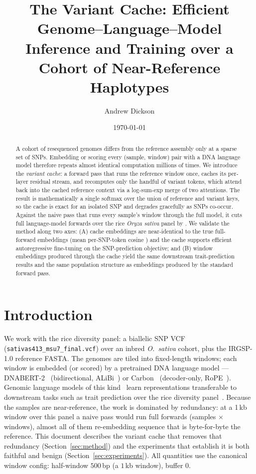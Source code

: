 \documentclass[11pt]{article}
\title{The Variant Cache: Efficient Genome--Language--Model Inference and
Training over a Cohort of Near-Reference Haplotypes}
\author{Andrew Dickson}
\date{\today}
\begin{document}
\maketitle

\begin{abstract}
A cohort of resequenced genomes differs from the reference assembly only at a
sparse set of SNPs. Embedding or scoring every (sample, window) pair with a DNA
language model therefore repeats almost identical computation millions of times.
We introduce the \emph{variant cache}: a forward pass that runs the reference
window once, caches its per-layer residual stream, and recomputes only the
handful of variant tokens, which attend back into the cached reference context
via a log-sum-exp merge of two attentions. The result is mathematically a single
softmax over the union of reference and variant keys, so the cache is exact for
an isolated SNP and degrades gracefully as SNPs co-occur. Against the naive pass
that runs every sample's window through the full model, it cuts full
language-model forwards over the rice \textit{Oryza sativa} panel by
\cacheFactor{}. We validate the method along two
axes: (A) cache embeddings are near-identical to the true full-forward
embeddings (mean per-SNP-token cosine \varCosMean{}) and the cache supports
efficient autoregressive fine-tuning on the SNP-prediction objective; and (B)
window embeddings produced through the cache yield the same downstream
trait-prediction results and the same population structure as
embeddings produced by the standard forward pass.
\end{abstract}

\section{Introduction}
\label{sec:intro}
We work with the rice diversity panel: a biallelic SNP VCF
(\texttt{sativas413\_msu7\_final.vcf}) over an inbred \textit{O.\ sativa} cohort,
plus the IRGSP-1.0 reference FASTA. The genomes are tiled into fixed-length
windows; each window is embedded (or scored) by a pretrained DNA language model
--- DNABERT-2~\cite{zhou2023dnabert2} (bidirectional, ALiBi~\cite{press2022alibi})
or Carbon~\cite{carbon2024} (decoder-only, RoPE~\cite{su2021rope}). Genomic
language models of this kind~\cite{zhou2023dnabert2,dallatorre2023nucleotide}
learn representations transferable to downstream tasks such as trait prediction
over the rice diversity panel~\cite{zhao2011rice}. Because the
samples are near-reference, the work is dominated by redundancy: at a 1\,kb
window over this panel a naive pass would run \naiveForwards{} full forwards
(samples $\times$ windows), almost all of them re-embedding sequence that is
byte-for-byte the reference. This document describes the variant cache that
removes that redundancy (Section~\ref{sec:method}) and the experiments that
establish it is both faithful and benign (Section~\ref{sec:experiments}).
All quantities use the canonical window config: half-window $500$\,bp (a
$1$\,kb window), buffer $0$.
\end{document}
